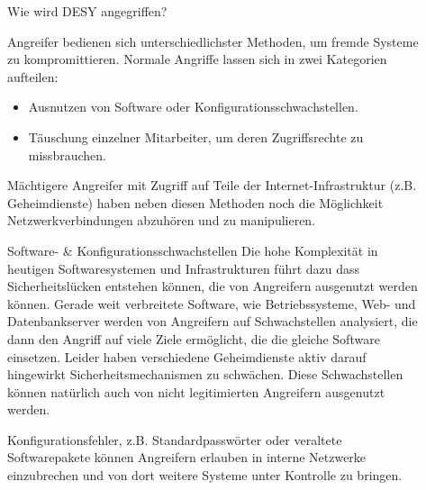 \documentclass[final]{beamer}
\newlength{\sepwid}
\newlength{\twocolwid}
\begin{document}
\begin{frame}[t]
\begin{columns}[t, totalwidth=\textwidth]
\begin{column}{\twocolwid}

\begin{block}{Wie wird DESY angegriffen?}

Angreifer bedienen sich unterschiedlichster Methoden, um fremde Systeme zu 
kompromittieren. Normale Angriffe lassen sich in zwei Kategorien aufteilen:

\begin{itemize}
 \item Ausnutzen von Software oder Konfigurationsschwachstellen.
 \item Täuschung einzelner Mitarbeiter, um deren Zugriffsrechte zu missbrauchen.
\end{itemize}

Mächtigere Angreifer mit Zugriff auf Teile der Internet-Infrastruktur 
(z.B. Geheimdienste) haben neben diesen Methoden noch die Möglichkeit 
Netzwerkverbindungen abzuhören und zu manipulieren.

\end{block}

\begin{block}{Software- \& Konfigurationsschwachstellen}
 Die hohe Komplexität in heutigen Softwaresystemen und Infrastrukturen führt dazu dass
 Sicherheitslücken entstehen können, die von Angreifern ausgenutzt werden können. 
 Gerade weit verbreitete Software, wie Betriebssysteme, Web- und Datenbankserver werden 
 von Angreifern auf Schwachstellen analysiert, die dann den Angriff auf viele Ziele ermöglicht, 
 die die gleiche Software einsetzen. Leider haben verschiedene Geheimdienste aktiv darauf 
 hingewirkt Sicherheitsmechanismen zu schwächen. Diese Schwachstellen können natürlich auch 
 von nicht legitimierten Angreifern ausgenutzt werden.
 \par
 Konfigurationsfehler, z.B. Standardpasswörter oder veraltete Softwarepakete können
 Angreifern erlauben in interne Netzwerke einzubrechen und von dort weitere Systeme 
 unter Kontrolle zu bringen.
\end{block}


\end{column} %

\begin{column}{\sepwid}\end{column} %

\begin{column}{\twocolwid} %


\end{column}
\end{columns}
\end{frame}
\end{document}
